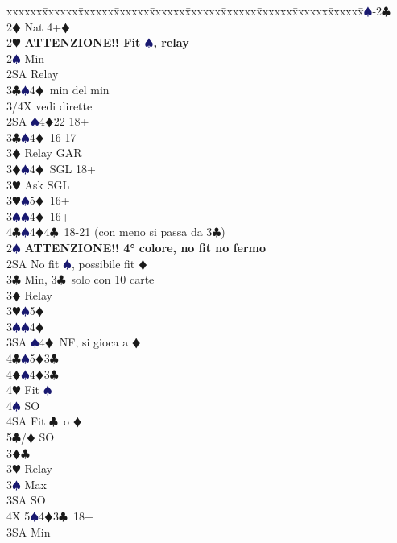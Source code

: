 \documentclass[a4paper,italian]{article}
\newcommand{\BC}{\textcolor{OliveGreen}{$\clubsuit$}}
\newcommand{\BD}{\textcolor{RedOrange}{$\vardiamondsuit$}}
\newcommand{\BH}{\textcolor{Red2}{$\varheartsuit${}}}
\newcommand{\BS}{\textcolor{MidnightBlue}{$\spadesuit${}}}
\newenvironment{bidtable}
{\begin{tabbing}

    xxxxxx\=xxxxxx\=xxxxxx\=xxxxxx\=xxxxxx\=xxxxxx\=xxxxxx\=xxxxxx\=xxxxxx\=xxxxxx\=\kill}
{\end{tabbing} }%
\begin{document}
\begin{multicols}{2}
    \begin{bidtable}
        1\BS-2\BC\\
        2\BD \> Nat 4+\BD \+\\
        2\BH \> \textbf{ATTENZIONE!! Fit \BS , relay}\+\\
        2\BS \> Min\+\\
        2SA \> Relay\+\\
        3\BC {}\BS 4\BD\ min del min\\
        3/4X \> vedi dirette\-\-\\
        2SA \BS 4\BD 22 18+\\
        3\BC {}\BS 4\BD\ 16-17\+\\
        3\BD \> Relay GAR\-\\
        3\BD {}\BS 4\BD\ SGL 18+\+\\
        3\BH \> Ask SGL\-\\
        3\BH {}\BS 5\BD\ 16+\\
        3\BS {}\BS 4\BD\ 16+\\
        4\BC {}\BS 4\BD 4\BC\ 18-21 (con meno si passa da 3\BC )\-\\
        2\BS \> \textbf{ATTENZIONE!! 4° colore, no fit no fermo}\\
        2SA \> No fit \BS , possibile fit \BD\+\\
        3\BC \> Min, 3\BC\ solo con 10 carte\+\\
        3\BD \> Relay\+\\
        3\BH {}\BS 5\BD \\
        3\BS {}\BS 4\BD \\
        3SA \BS 4\BD\ NF, si gioca a \BD \\
        4\BC {}\BS 5\BD 3\BC \\
        4\BD {}\BS 4\BD 3\BC \+\\
        4\BH \> Fit \BS\\
        4\BS \> SO \\
        4SA \> Fit \BC\ o \BD \\
        5\BC/\BD \> SO\-\-\-\\
        3\BD {}\BC \+\\
        3\BH \> Relay\+\\
        3\BS \> Max\+\\
        3SA \> SO\+\\
        4X 5\BS 4\BD 3\BC\ 18+\-\-\\
        3SA \> Min\\

\end{bidtable}
\end{multicols}
\end{document}

